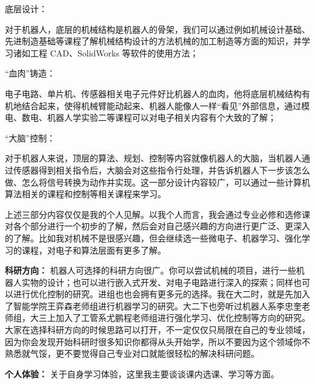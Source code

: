 \vspace{10pt}

底层设计：

对于机器人，底层的机械结构是机器人的骨架，我们可以通过例如机械设计基础、先进制造基础等课程了解机械结构设计的方法机械的加工制造等方面的知识，并学习诸如工程 CAD、SolidWorks 等软件的使用方法；

\vspace{10pt}

“血肉”铸造：

电子电路、单片机、传感器相关电子元件好比机器人的血肉，他将底层机械结构有机地结合起来，使得机械臂能动起来、机器人能像人一样“看见”外部信息，通过模电、数电、机器人学实验二等课程可以对电子相关内容有个大致的了解；

\vspace{10pt}

“大脑”控制：

对于机器人来说，顶层的算法、规划、控制等内容就像机器人的大脑，当机器人通过传感器得到相关指令后，大脑会对这些指令行处理，并告诉机器人下一步该怎么做、怎么将信号转换为动作并实现。这一部分设计内容较广，可以通过一些计算机算法相关的课程和控制等相关课程来学习。

\vspace{10pt}

上述三部分内容仅仅是我的个人见解。以我个人而言，我会通过专业必修和选修课对各个部分进行一个初步的了解，然后会对自己感兴趣的方向进行更广泛、更深入的了解。比如我对机械不是很感兴趣，但会继续选一些微电子、机器学习、强化学习的课程，对电子和算法层面有更多了解。

\vspace{10pt}

\textbf{科研方向：}
机器人可选择的科研方向很广。你可以尝试机械的项目，进行一些机器人实物的设计；也可以进行嵌入式开发、对电子电路进行深入的探索；同样也可以进行优化控制的研究。进组也也会拥有更多元的选择。我在大二时，就是先加入了智能学院王弈森老师组进行机器学习的研究。大二下也旁听过机器人系李忠奎老师组，大三上加入了工管系尤鹏程老师组进行强化学习、优化控制等方向的研究。大家在选择科研方向的时候思路可以打开，不一定仅仅只局限在自己的专业领域，因为你会发现开始科研时很多知识你都得从头开始学，所以不要因为这个领域你不熟悉就气馁，更不要觉得自己专业对口就能很轻松的解决科研问题。

\vspace{10pt}

\textbf{个人体验：}
关于自身学习体验，这里我主要谈谈课内选课、学习等方面。

\vspace{10pt}

